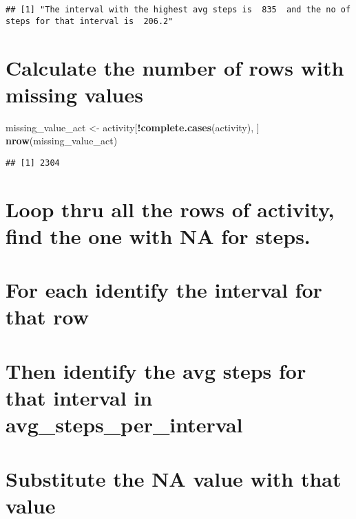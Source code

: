 \documentclass[
]{article}
\newenvironment{Shaded}{\begin{snugshade}}{\end{snugshade}}
\newcommand{\KeywordTok}[1]{\textcolor[rgb]{0.13,0.29,0.53}{\textbf{#1}}}
\newcommand{\NormalTok}[1]{#1}
\newcommand{\OperatorTok}[1]{\textcolor[rgb]{0.81,0.36,0.00}{\textbf{#1}}}
\newcommand{\StringTok}[1]{\textcolor[rgb]{0.31,0.60,0.02}{#1}}
\begin{document}
\begin{verbatim}
## [1] "The interval with the highest avg steps is  835  and the no of steps for that interval is  206.2"
\end{verbatim}

\hypertarget{calculate-the-number-of-rows-with-missing-values}{%
\section{Calculate the number of rows with missing
values}\label{calculate-the-number-of-rows-with-missing-values}}

\begin{Shaded}
\begin{Highlighting}[]
\NormalTok{missing_value_act <-}\StringTok{ }\NormalTok{activity[}\OperatorTok{!}\KeywordTok{complete.cases}\NormalTok{(activity), ]}
\KeywordTok{nrow}\NormalTok{(missing_value_act)}
\end{Highlighting}
\end{Shaded}

\begin{verbatim}
## [1] 2304
\end{verbatim}

\hypertarget{loop-thru-all-the-rows-of-activity-find-the-one-with-na-for-steps.}{%
\section{Loop thru all the rows of activity, find the one with NA for
steps.}\label{loop-thru-all-the-rows-of-activity-find-the-one-with-na-for-steps.}}

\hypertarget{for-each-identify-the-interval-for-that-row}{%
\section{For each identify the interval for that
row}\label{for-each-identify-the-interval-for-that-row}}

\hypertarget{then-identify-the-avg-steps-for-that-interval-in-avg_steps_per_interval}{%
\section{Then identify the avg steps for that interval in
avg\_steps\_per\_interval}\label{then-identify-the-avg-steps-for-that-interval-in-avg_steps_per_interval}}

\hypertarget{substitute-the-na-value-with-that-value}{%
\section{Substitute the NA value with that
value}\label{substitute-the-na-value-with-that-value}}
\end{document}
